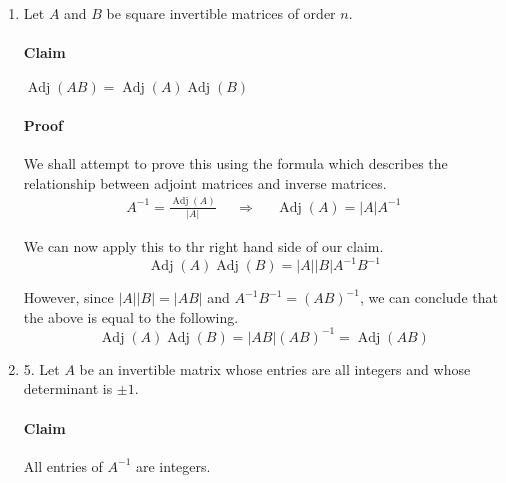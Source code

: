 \documentclass[fleqn]{article}
\newenvironment{answers}{ %
	\begin{enumerate}
		\setlength{\itemsep}{\bigskipamount}
}{\end{enumerate}}
\newcommand{\Adj}{\operatorname{Adj}}
\begin{document}
\begin{answers}
\begin{enumerate}
				In order to find \(A^{-1}\) using this, we can use the following equation.
				\begin{align*}
					A^{-1} & = |A|^{-1}\cdot \Adj(A) \\
					       & = -\frac{1}{2}\Adj(A) \\
					       & = \left[ \begin{matrix}
							\frac{7}{2}  & -3 & \frac{1}{2}  \\[6pt]
							-\frac{1}{2} & 0  & \frac{1}{2}  \\[6pt]
							-\frac{1}{2} & 1  & -\frac{1}{2}
						\end{matrix} \right]
				\end{align*}
		\end{enumerate}

	\item
		Let \(A\) and \(B\) be square invertible matrices of order \(n\).

		\paragraph{Claim} \(\Adj(AB) = \Adj(A) \Adj(B)\)

		\paragraph{Proof} We shall attempt to prove this using the formula which describes the relationship between adjoint matrices and inverse matrices.
		\begin{align*}
			A^{-1} = \frac{\Adj(A)}{|A|} &  & \Rightarrow &  & \Adj(A) = |A|A^{-1}
		\end{align*}

		We can now apply this to thr right hand side of our claim.
		\begin{equation*}
			\Adj(A) \Adj(B) = |A||B|A^{-1}B^{-1}
		\end{equation*}

		However, since \(|A||B| = |AB|\) and \(A^{-1}B^{-1} = (AB)^{-1}\), we can conclude that the above is equal to the following.
		\begin{equation*}
			\Adj(A) \Adj(B) = |AB|(AB)^{-1} = \Adj(AB)
		\end{equation*}

	\item[5.]
		Let \(A\) be an invertible matrix whose entries are all integers and whose determinant is \(\pm1\).

		\paragraph{Claim} All entries of \(A^{-1}\) are integers.


\end{answers}
\end{document}
